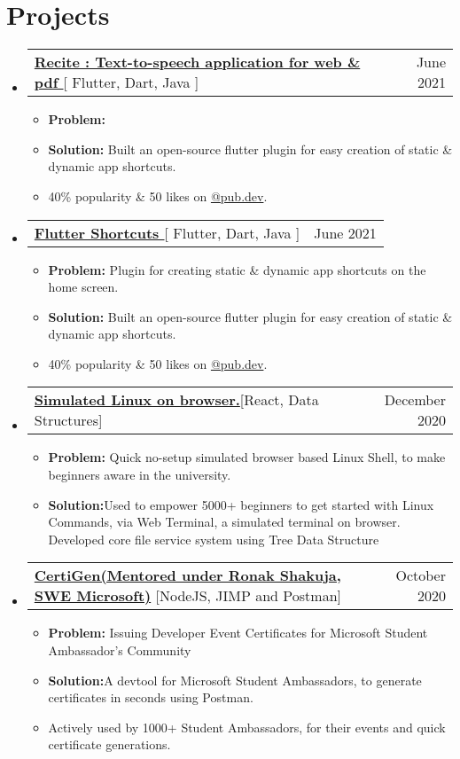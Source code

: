 \documentclass[letterpaper,11pt]{article}
\makeatletter
\newcommand{\resumeItem}[1]{
  \item\small{
    {#1 \vspace{-2pt}}
  }
}
\newcommand{\resumeProjectHeading}[2]{
    \item
    \begin{tabular*}{0.97\textwidth}{l@{\extracolsep{\fill}}r}
      \small#1 & #2 \\
    \end{tabular*}\vspace{-7pt}
}
\newcommand{\resumeSubHeadingListStart}{\begin{itemize}[leftmargin=0.15in, label={}]}
\newcommand{\resumeSubHeadingListEnd}{\end{itemize}}
\newcommand{\resumeItemListStart}{\begin{itemize}}
\newcommand{\resumeItemListEnd}{\end{itemize}\vspace{-5pt}}
\makeatother
\begin{document}
\section{Projects}
    \resumeSubHeadingListStart
      \resumeProjectHeading
          {\textbf{\href{https://play.google.com/store/apps/details?id=com.hackthedeveloper.recite}{Recite : Text-to-speech application for web \& pdf }}{[ Flutter, Dart, Java ]}}{June 2021}
          \resumeItemListStart
           \resumeItem{\textbf{Problem: } }
           \resumeItem{\textbf{Solution:} Built an open-source flutter plugin for easy creation of static \& dynamic app shortcuts. }
           \resumeItem{40\% popularity \& 50 likes on  \href{https://pub.dev/packages/flutter_shortcuts}{@pub.dev}.}
          \resumeItemListEnd
    \resumeSubHeadingListEnd

    \resumeSubHeadingListStart
      \resumeProjectHeading
          {\textbf{\href{https://pub.dev/packages/flutter_shortcuts}{Flutter Shortcuts }}{[ Flutter, Dart, Java ]}}{June 2021}
          \resumeItemListStart
           \resumeItem{\textbf{Problem:} Plugin for creating static \& dynamic app shortcuts on the home screen.}
           \resumeItem{\textbf{Solution:} Built an open-source flutter plugin for easy creation of static \& dynamic app shortcuts. }
           \resumeItem{40\% popularity \& 50 likes on  \href{https://pub.dev/packages/flutter_shortcuts}{@pub.dev}.}
          \resumeItemListEnd
    \resumeSubHeadingListEnd
    
     \resumeSubHeadingListStart
      \resumeProjectHeading
          {\textbf{\href{https://imabp.github.io/WebTerminal/}{Simulated Linux on browser.}}{[React, Data Structures]}}{December 2020}
          \resumeItemListStart
            \resumeItem{\textbf{Problem:} Quick no-setup simulated browser based Linux Shell, to make beginners aware in the university.}
            \resumeItem{\textbf{Solution:}Used to empower 5000+ beginners to get started with Linux Commands, via Web Terminal, a simulated terminal on browser. Developed core file service system using Tree Data Structure}
          \resumeItemListEnd
    \resumeSubHeadingListEnd
  \resumeSubHeadingListStart
      \resumeProjectHeading
          {\textbf{\href{https://github.com/imabp/CertiGen}{\textbf{CertiGen(Mentored under Ronak Shakuja, SWE Microsoft)}}}{ [NodeJS, JIMP and Postman]}}{October 2020}
          \resumeItemListStart
            \resumeItem{\textbf{Problem:} Issuing Developer Event Certificates for Microsoft Student Ambassador's Community}
            \resumeItem{\textbf{Solution:}A devtool for Microsoft Student Ambassadors, to generate certificates in seconds using Postman.  }
            \resumeItem{Actively used by 1000+ Student Ambassadors, for their events and quick certificate generations. }
          \resumeItemListEnd
    \resumeSubHeadingListEnd
\end{document}
